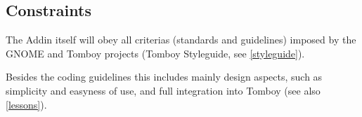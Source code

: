 \subsection{Constraints}
\label{description:constraints}
The Addin itself will obey all criterias (standards and guidelines) imposed by the GNOME and Tomboy projects (Tomboy Styleguide, see \ref{styleguide}).

Besides the coding guidelines this includes mainly design aspects, such as simplicity and easyness of use, and full integration into Tomboy (see also \ref{lessons}).
